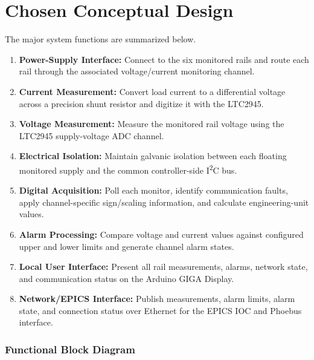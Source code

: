 
\chapter{Chosen Conceptual Design}
\label{chap:con-design}
The major system functions are summarized below.

\begin{enumerate}
	\item \textbf{Power-Supply Interface:} Connect to the six monitored rails and
	route each rail through the associated voltage/current monitoring channel.
	\item \textbf{Current Measurement:} Convert load current to a differential
	voltage across a precision shunt resistor and digitize it with the
	LTC2945.
	\item \textbf{Voltage Measurement:} Measure the monitored rail voltage using
	the LTC2945 supply-voltage ADC channel.
	\item \textbf{Electrical Isolation:} Maintain galvanic isolation between each
	floating monitored supply and the common controller-side I\textsuperscript{2}C bus.
	\item \textbf{Digital Acquisition:} Poll each monitor, identify communication
	faults, apply channel-specific sign/scaling information, and calculate
	engineering-unit values.
	\item \textbf{Alarm Processing:} Compare voltage and current values against
	configured upper and lower limits and generate channel alarm states.
	\item \textbf{Local User Interface:} Present all rail measurements, alarms,
	network state, and communication status on the Arduino GIGA Display.
	\item \textbf{Network/EPICS Interface:} Publish measurements, alarm limits,
	alarm state, and connection status over Ethernet for the EPICS IOC and
	Phoebus interface.
\end{enumerate}

\subsection{Functional Block Diagram}

